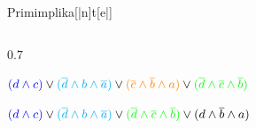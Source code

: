 \documentclass[aspectratio=169,usepdftitle=true,11pt,ngerman,t]{beamer}
\begin{document}
\begin{frame}{Primimplika[|n]t[e|]}
\begin{solve}
\begin{columns}[T]
\begin{column}{0.7\textwidth}
{            \(\textcolor{blue}{(d \land c)} \lor
            \textcolor{cyan}{(\overline{d} \land b \land \overline{a})} \lor
            \textcolor{orange}{(\overline{c} \land \overline{b} \land a)} \lor
            \textcolor{green}{(\overline{d} \land \overline{c} \land \overline{b})}\)

            \(\textcolor{blue}{(d \land c)} \lor
            \textcolor{cyan}{(\overline{d} \land b \land \overline{a})} \lor
            \textcolor{green}{(\overline{d} \land \overline{c} \land \overline{b})} \lor
            \textcolor{black}{(d \land \overline{b} \land a)}\)
        }
    \end{column}
    \end{columns}
    \end{solve}
\end{frame}
\end{document}
